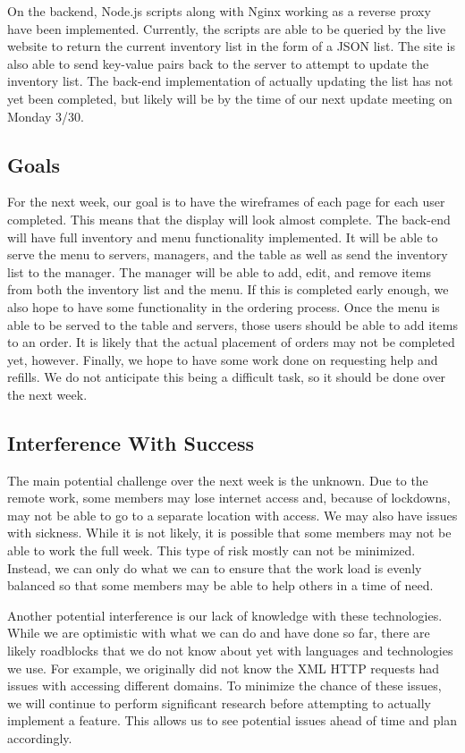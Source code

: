 \documentclass[12pt]{article}
\begin{document}
			On the backend, Node.js scripts along with Nginx working as a reverse proxy have been implemented. Currently, the scripts are able to be queried by the live website to return the current inventory list in the form of a JSON list. The site is also able to send key-value pairs back to the server to attempt to update the inventory list. The back-end implementation of actually updating the list has not yet been completed, but likely will be by the time of our next update meeting on Monday 3/30.


		\subsection{Goals}
			For the next week, our goal is to have the wireframes of each page for each user completed. This means that the display will look almost complete. The back-end will have full inventory and menu functionality implemented. It will be able to serve the menu to servers, managers, and the table as well as send the inventory list to the manager. The manager will be able to add, edit, and remove items from both the inventory list and the menu. If this is completed early enough, we also hope to have some functionality in the ordering process. Once the menu is able to be served to the table and servers, those users should be able to add items to an order. It is likely that the actual placement of orders may not be completed yet, however. Finally, we hope to have some work done on requesting help and refills. We do not anticipate this being a difficult task, so it should be done over the next week.

		\subsection{Interference With Success}
			The main potential challenge over the next week is the unknown. Due to the remote work, some members may lose internet access and, because of lockdowns, may not be able to go to a separate location with access. We may also have issues with sickness. While it is not likely, it is possible that some members may not be able to work the full week. This type of risk mostly can not be minimized. Instead, we can only do what we can to ensure that the work load is evenly balanced so that some members may be able to help others in a time of need.

			Another potential interference is our lack of knowledge with these technologies. While we are optimistic with what we can do and have done so far, there are likely roadblocks that we do not know about yet with languages and technologies we use. For example, we originally did not know the XML HTTP requests had issues with accessing different domains. To minimize the chance of these issues, we will continue to perform significant research before attempting to actually implement a feature. This allows us to see potential issues ahead of time and plan accordingly.

	\begin{thebibliography}{00}
	\end{thebibliography}
\end{document}
